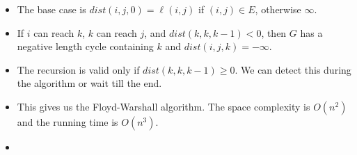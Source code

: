 \begin{itemize}
\begin{center}
    \end{center}
    \item The base case is $dist(i, j, 0) = \ell(i, j)$ if $(i, j) \in E$, otherwise $\infty$.
    \item If $i$ can reach $k$, $k$ can reach $j$, and $dist(k, k, k - 1) < 0$, then $G$ has a negative length cycle containing $k$ and $dist(i, j, k) = -\infty$.
    \item The recursion is valid only if $dist(k, k, k - 1) \geq 0$. We can detect this during the algorithm or wait till the end.
    \item This gives us the Floyd-Warshall algorithm. The space complexity is $O(n^2)$ and the running time is $O(n^3)$.
    \item[] 
\end{itemize}
